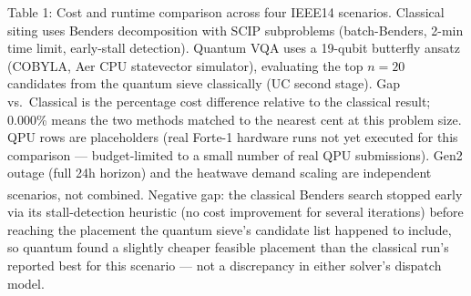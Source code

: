 \begin{minipage}{9.6in}
\small
Table 1: Cost and runtime comparison across four IEEE14 scenarios.
Classical siting uses Benders decomposition with SCIP subproblems
(batch-Benders, 2-min time limit, early-stall detection). Quantum VQA uses a
19-qubit butterfly ansatz (COBYLA, Aer CPU statevector simulator), evaluating
the top $n=20$ candidates from the quantum sieve classically (UC second
stage). Gap vs.\ Classical is the percentage cost difference relative to the
classical result; 0.000\% means the two methods matched to the nearest cent
at this problem size. QPU rows are placeholders (real Forte-1 hardware runs
not yet executed for this comparison --- budget-limited to a small number of
real QPU submissions). Gen2 outage (full 24h horizon) and the heatwave
demand scaling are independent scenarios, not combined.
\textsuperscript{\dag}Negative gap: the classical Benders search stopped
early via its stall-detection heuristic (no cost improvement for several
iterations) before reaching the placement the quantum sieve's candidate list
happened to include, so quantum found a slightly cheaper feasible placement
than the classical run's reported best for this scenario --- not a
discrepancy in either solver's dispatch model.
\end{minipage}
